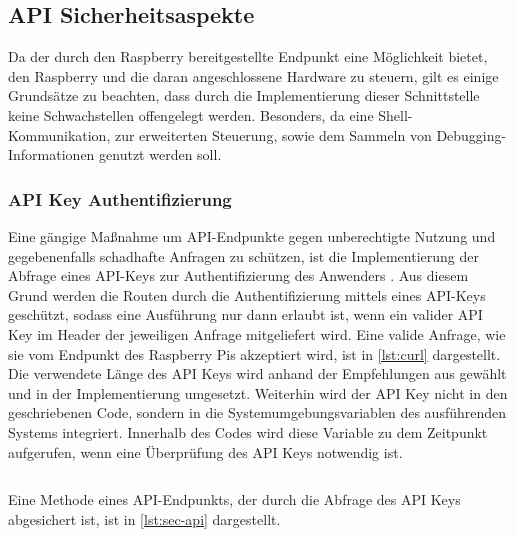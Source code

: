 \subsection{API Sicherheitsaspekte}
Da der durch den Raspberry bereitgestellte Endpunkt eine Möglichkeit bietet, den Raspberry und die daran angeschlossene Hardware zu steuern, gilt es einige Grundsätze zu beachten, dass durch die Implementierung dieser Schnittstelle keine Schwachstellen offengelegt werden. Besonders, da eine Shell-Kommunikation, zur erweiterten Steuerung, sowie dem Sammeln von Debugging-Informationen genutzt werden soll.

\subsubsection*{API Key Authentifizierung}
Eine gängige Maßnahme um API-Endpunkte gegen unberechtigte Nutzung und gegebenenfalls schadhafte Anfragen zu schützen, ist die Implementierung der Abfrage eines API-Keys zur Authentifizierung des Anwenders \cite{De2017}. Aus diesem Grund werden die Routen durch die Authentifizierung mittels eines API-Keys geschützt, sodass eine Ausführung nur dann erlaubt ist, wenn ein valider API Key im Header der jeweiligen Anfrage mitgeliefert wird. Eine valide Anfrage, wie sie vom Endpunkt des Raspberry Pis akzeptiert wird, ist in \autoref{lst:curl} dargestellt. Die verwendete Länge des API Keys wird anhand der Empfehlungen aus \cite{NISTSP800-57pt3r1} gewählt und in der Implementierung umgesetzt. Weiterhin wird der API Key nicht in den geschriebenen Code, sondern in die Systemumgebungsvariablen des ausführenden Systems integriert. Innerhalb des Codes wird diese Variable zu dem Zeitpunkt aufgerufen, wenn eine Überprüfung des API Keys notwendig ist.

\inputminted{text}{{assets/code/curl.sh}}
\vspace*{-3mm}
\vspace*{3mm}

Eine Methode eines API-Endpunkts, der durch die Abfrage des API Keys abgesichert ist, ist in \autoref{lst:sec-api} dargestellt.

\inputminted{python}{{assets/code/run-shell.py}}
\vspace*{-3mm}
\vspace*{3mm}

